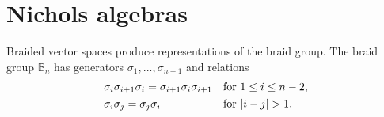 \documentclass[graybox]{svmult}
\newcommand{\B}{\mathbb{B}}
\newcommand{\C}{\mathbb{C}}
\newcommand{\Alt}{\mathbb{A}}
\newcommand{\Sym}{\mathbb{S}}
\begin{document}
%
%
%
%



\section{Nichols algebras}

Braided vector spaces produce representations of the braid group. 
The braid group $\B_n$ has generators
$\sigma_{1},...,\sigma_{n-1}$ and relations
\begin{align*}
	&\sigma_{i}\sigma_{i+1}\sigma_{i}=\sigma_{i+1}\sigma_{i}\sigma_{i+1} && \text{for }1\leq i\leq n-2,\\
	&\sigma_{i}\sigma_{j}=\sigma_{j}\sigma_{i} && \text{for \ensuremath{|i-j|>1}.}
\end{align*}
\end{document}
